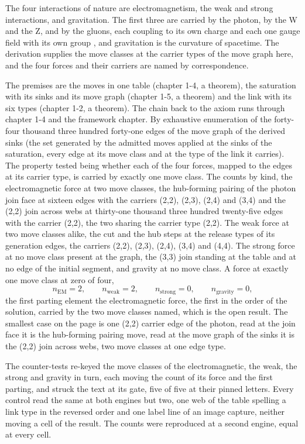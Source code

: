 \begin{chbridge}
The four interactions of nature are electromagnetism, the weak and strong interactions, and gravitation. The first three are carried by the photon, by the W and the Z, and by the gluons, each coupling to its own charge and each one gauge field with its own group \cite{Glashow1961,Weinberg1967,Gross1973}, and gravitation is the curvature of spacetime. The derivation supplies the move classes at the carrier types of the move graph here, and the four forces and their carriers are named by correspondence.
\end{chbridge}
\begin{chproof}[census]
The premises are the moves in one table (chapter 1-4, a theorem), the saturation with its sinks and its move graph (chapter 1-5, a theorem) and the link with its six types (chapter 1-2, a theorem). The chain back to the axiom runs through chapter 1-4 and the framework chapter. By exhaustive enumeration of the forty-four thousand three hundred forty-one edges of the move graph of the derived sinks (the set generated by the admitted moves applied at the sinks of the saturation, every edge at its move class and at the type of the link it carries). The property tested being whether each of the four forces, mapped to the edges at its carrier type, is carried by exactly one move class. The counts by kind, the electromagnetic force at two move classes, the hub-forming pairing of the photon join face at sixteen edges with the carriers (2,2), (2,3), (2,4) and (3,4) and the (2,2) join across webs at thirty-one thousand three hundred twenty-five edges with the carrier (2,2), the two sharing the carrier type (2,2). The weak force at two move classes alike, the cut and the hub steps at the release types of its generation edges, the carriers (2,2), (2,3), (2,4), (3,4) and (4,4). The strong force at no move class present at the graph, the (3,3) join standing at the table and at no edge of the initial segment, and gravity at no move class. A force at exactly one move class at zero of four,
\begin{equation}
n_{\mathrm{EM}} = 2,\qquad n_{\mathrm{weak}} = 2,\qquad n_{\mathrm{strong}} = 0,\qquad n_{\mathrm{gravity}} = 0 ,
\end{equation}
the first parting element the electromagnetic force, the first in the order of the solution, carried by the two move classes named, which is the open result. The smallest case on the page is one (2,2) carrier edge of the photon, read at the join face it is the hub-forming pairing move, read at the move graph of the sinks it is the (2,2) join across webs, two move classes at one edge type.

The counter-tests re-keyed the move classes of the electromagnetic, the weak, the strong and gravity in turn, each moving the count of its force and the first parting, and struck the text at its gate, five of five at their pinned letters. Every control read the same at both engines but two, one web of the table spelling a link type in the reversed order and one label line of an image capture, neither moving a cell of the result. The counts were reproduced at a second engine, equal at every cell.
\end{chproof}
